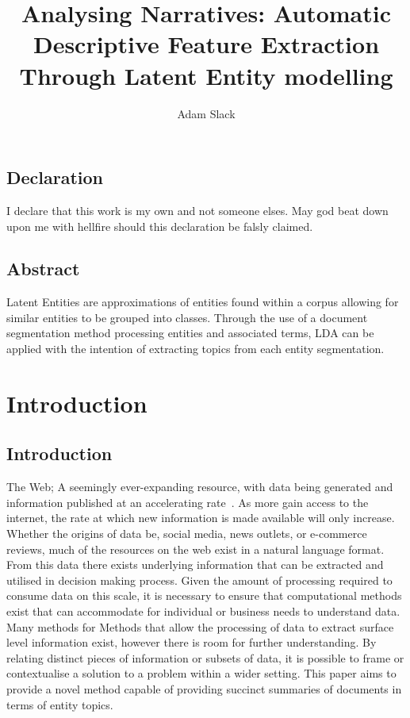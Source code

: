 \documentclass[10pt]{report}
\title{Analysing Narratives: Automatic Descriptive Feature Extraction Through Latent Entity modelling}
\author{Adam Slack}
\date{}
\begin{document}
 
\begin{titlepage}
  \maketitle
\end{titlepage}

\section*{Declaration}
I declare that this work is my own and not someone elses. May god beat down upon me with hellfire should this declaration be falsly claimed.


\newpage
{}
\section*{Abstract}
Latent Entities are approximations of entities found within a corpus allowing for similar entities to be grouped into classes. Through the use of a document segmentation method processing entities and associated terms, LDA can be applied with the intention of extracting topics from each entity segmentation.



\renewcommand{\baselinestretch}{0.5}\normalsize
\tableofcontents
\listoffigures
\renewcommand{\baselinestretch}{2.0}\normalsize

%
%
%
%
\chapter{Introduction}

\section{Introduction}
The Web; A seemingly ever-expanding resource, with data being generated and information published at an accelerating rate~\cite{WebServer-lc}. As more gain access to the internet, the rate at which new information is made available will only increase. Whether the origins of data be, social media, news outlets, or e-commerce reviews, much of the resources on the web exist in a natural language format. From this data there exists underlying information that can be extracted and utilised in decision making process. Given the amount of processing required to consume data on this scale, it is necessary to ensure that computational methods exist that can accommodate for individual or business needs to understand data. Many methods for Methods that allow the processing of data to extract surface level information exist, however there is room for further understanding. By relating distinct pieces of information or subsets of data, it is possible to frame or contextualise a solution to a problem within a wider setting. This paper aims to provide a novel method capable of providing succinct summaries of documents in terms of entity topics.
\end{document}
